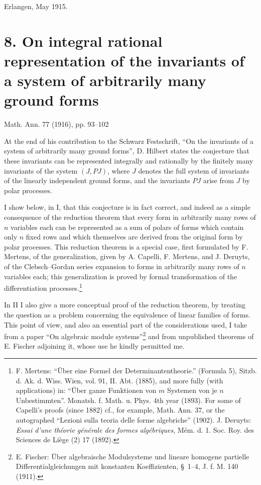 \documentclass[11pt]{article}
\begin{document}
Erlangen, May 1915.

\clearpage
\section*{8. On integral rational representation of the invariants of a system of arbitrarily many ground forms}
\begin{center}
Math. Ann. 77 (1916), pp. 93--102
\end{center}

At the end of his contribution to the Schwarz Festschrift, ``On the invariants of a system of arbitrarily many ground forms'', D. Hilbert states the conjecture that these invariants can be represented integrally and rationally by the finitely many invariants of the system $(J,PJ)$, where $J$ denotes the full system of invariants of the linearly independent ground forms, and the invariants $PJ$ arise from $J$ by polar processes.

I show below, in I, that this conjecture is in fact correct, and indeed as a simple consequence of the reduction theorem that every form in arbitrarily many rows of $n$ variables each can be represented as a sum of polars of forms which contain only $n$ fixed rows and which themselves are derived from the original form by polar processes. This reduction theorem is a special case, first formulated by F. Mertens, of the generalization, given by A. Capelli, F. Mertens, and J. Deruyts, of the Clebsch--Gordan series expansion to forms in arbitrarily many rows of $n$ variables each; this generalization is proved by formal transformation of the differentiation processes.\footnote{F. Mertens: ``Über eine Formel der Determinantentheorie.'' (Formula 5), Sitzb. d. Ak. d. Wiss. Wien, vol. 91, II. Abt. (1885), and more fully (with applications) in: ``Über ganze Funktionen von $m$ Systemen von je $n$ Unbestimmten''. Monatsh. f. Math. u. Phys. 4th year (1893). For some of Capelli's proofs (since 1882) cf., for example, Math. Ann. 37, or the autographed ``Lezioni sulla teoria delle forme algebriche'' (1902). J. Deruyts: \emph{Essai d'une théorie générale des formes algébriques}, Mém. d. 1. Soc. Roy. des Sciences de Liège (2) 17 (1892).}

In II I also give a more conceptual proof of the reduction theorem, by treating the question as a problem concerning the equivalence of linear families of forms. This point of view, and also an essential part of the considerations used, I take from a paper ``On algebraic module systems''\footnote{E. Fischer: Über algebraische Modulsysteme und lineare homogene partielle Differentialgleichungen mit konstanten Koeffizienten, \S\ 1--4, J. f. M. 140 (1911).} and from unpublished theorems of E. Fischer adjoining it, whose use he kindly permitted me.
\end{document}
